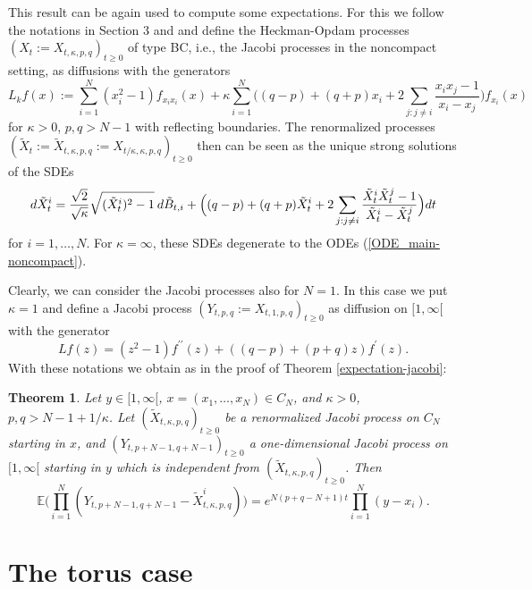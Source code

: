 \documentclass[reqno]{amsart}
\theoremstyle{plain}
\newtheorem{theorem}{Theorem}[section]
\theoremstyle{definition}
\numberwithin{equation}{section}
\begin{document}
This result can be again used to compute some expectations. For this we follow the notations in Section 3 and \cite{AVW}
and define
the Heckman-Opdam processes $(X_t:=X_{t,\kappa,p,q})_{t\ge0}$ of type BC, i.e., the Jacobi processes in the noncompact setting, as diffusions
with the generators
\begin{equation}\label{generator-noncompact}
  L_kf(x):=\sum_{i=1}^N (x_i^2-1)f_{x_ix_i}(x)+
 \kappa \sum_{i=1}^N\Biggl((q-p) + (q+p)x_i
  +2\sum_{j: j\ne i} \frac{x_ix_j-1}{x_i-x_j}\Biggr)f_{x_i}(x)
\end{equation}
for $\kappa>0$, $p,q>N-1$ with reflecting boundaries. The renormalized processes
$(\tilde X_{t}:=\tilde X_{t,\kappa,p,q}:= X_{t/\kappa, \kappa,p,q})_{t\ge0}$ then can be seen  as the 
unique strong solutions of the SDEs
\begin{equation}\label{SDE-alcove-normalized-noncompact}
  d\tilde X_{t}^i =\frac{\sqrt 2}{\sqrt\kappa } \sqrt{(\tilde X_{t}^i)^2-1}\> d\tilde B_{t,i} 
+\Bigl((q-p) +(q+p)\tilde X_{t}^i +
2\sum_{j: j\ne i}\frac{\tilde X_{t}^i\tilde X_{t}^j-1}{\tilde X_{t}^i-\tilde X_{t}^j}\Bigr)dt
\end{equation}
for $  i=1,\ldots,N$. 
For $\kappa=\infty$, these SDEs degenerate to the ODEs (\ref{ODE_main-noncompact}).


Clearly, we can consider the Jacobi processes also for $N=1$. In this case we put  $\kappa=1$ and define a
Jacobi process $(Y_{t,p,q}:=X_{t,1,p,q})_{t\ge0}$ as diffusion on $[1,\infty[$ with the generator
$$Lf(z)=(z^2-1)f^{\prime\prime}(z)+((q-p)+(p+q)z)f^{\prime}(z).$$
With these notations we obtain as in the proof of Theorem \ref{expectation-jacobi}:

\begin{theorem}\label{expectation-jacobi-noncompact}
  Let $y\in [1,\infty[$, $x=(x_1,\ldots,x_N)\in C_N$, and $\kappa>0$, $p,q>N-1+1/\kappa$.
Let  $(\tilde X_{t,\kappa,p,q})_{t\ge0}$ be a renormalized Jacobi process on $C_N$
starting in $x$, and  $(Y_{t,p+N-1,q+N-1})_{t\ge0}$ a one-dimensional Jacobi process  on $[1,\infty[$ starting in $y$
    which is independent from
 $(\tilde X_{t,\kappa,p,q})_{t\ge0}$. Then
\begin{equation}\label{equ-expectation-jacobi-noncompact}
\mathbb E\bigl(\prod_{i=1}^N (  Y_{t,p+N-1,q+N-1}- \tilde X_{t,\kappa,p,q}^i)\bigr)= e^{N(p+q-N+1)t}\prod_{i=1}^N (y- x_i).
\end{equation}
\end{theorem}


\section{The torus case}
\end{document}
